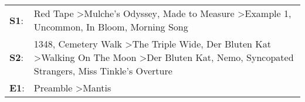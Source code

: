 \begin{supertabular}{p{0.03\textwidth}p{0.92\textwidth}}
 \textbf{S1}:  &                                                                                                                         Red Tape\textsuperscript{} \textgreater \enspace Mulche's Odyssey\textsuperscript{}, \enspace Made to Measure\textsuperscript{} \textgreater \enspace Example 1\textsuperscript{}, \enspace Uncommon\textsuperscript{}, \enspace In Bloom\textsuperscript{}, \enspace Morning Song\textsuperscript{}  \enspace  \\
 \textbf{S2}:  &  1348\textsuperscript{}, \enspace Cemetery Walk\textsuperscript{} \textgreater \enspace The Triple Wide\textsuperscript{}, \enspace Der Bluten Kat\textsuperscript{} \textgreater \enspace Walking On The Moon\textsuperscript{} \textgreater \enspace Der Bluten Kat\textsuperscript{}, \enspace Nemo\textsuperscript{}, \enspace Syncopated Strangers\textsuperscript{}, \enspace Miss Tinkle's Overture\textsuperscript{}  \enspace  \\
 \textbf{E1}:  &                                                                                                                                                                                                                                                                                                                                                    Preamble\textsuperscript{} \textgreater \enspace Mantis\textsuperscript{}  \enspace  \\
\end{supertabular}
